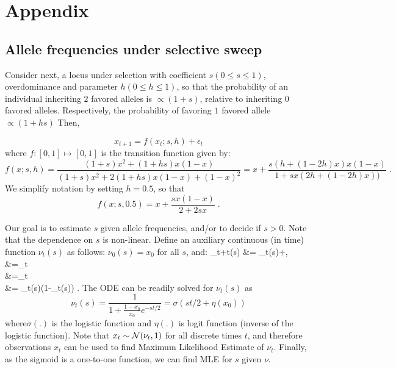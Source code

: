 \documentclass[11pt]{article}
\begin{document}
\newpage
\section{Appendix}
\subsection{Allele frequencies under selective sweep}
Consider next, a locus under selection with coefficient $s (0\le s\le
1)$, overdominance and parameter $h (0\le h\le 1)$, so that the
probability of an individual inheriting $2$ favored alleles is
$\propto (1+s)$, relative to inheriting $0$ favored
alleles. Respectively, the probability of favoring $1$ favored allele
$\propto (1+hs)$ Then,


\begin{equation}
x_{t+1} = f(x_t;s,h) + \epsilon_t
\label{eq:trans0} 
\end{equation}
where $f: [0,1] \mapsto [0,1]$ is the
transition function given by:
\begin{equation}
f(x;s,h)=\frac{(1+s)x^2 + (1+hs)x(1-x)}{(1+s)x^2 + 2(1+hs)x(1-x) + (1-x)^2}
=x+\frac{s(h+(1-2h)x)x(1-x)}{1+sx(2h+(1-2h)x))}\;.
\end{equation}
We simplify notation by setting $h=0.5$, so that
\begin{equation}
f(x;s,0.5)=x+\frac{sx(1-x)}{2+2sx}\;.
\label{eq:hequalshalf}
\end{equation}


Our goal is to estimate $s$ given allele frequencies, and/or to decide
if $s>0$. Note that the dependence on $s$ is non-linear. Define an
auxiliary continuous (in time) function $\nu_t(s)$ as follows:
$\nu_0(s)=x_0$ for all $s$, and:
\beqq
\nu_{t+\delta t}(s) &= \nu_t(s)+\;,\\
 &=\lim_{\delta t}\\
&=\lim_{\delta t}\\
&= \nu_t(s)(1-\nu_t(s)) \;.
\label{eq:ode}
\eeqq
The ODE can be readily solved for $\nu_t(s)$ as
\begin{equation}
\nu_t(s) =\frac{1}{1+\frac{1-x_0}{x_0}e^{-st/2}} = \sigma(st/2+\eta(x_0)) 
\label{eq:inf-pop}
\end{equation}
where$\sigma(.)$ is the logistic
function and $\eta(.)$ is logit function (inverse of the logistic function). Note 
that $x_t\sim{\cal N}(\nu_t,1)$ for all discrete times $t$,
and therefore observations $x_t$ can be used to find Maximum
Likelihood Estimate of $\nu_t$. Finally, as the sigmoid is a
one-to-one function, we can find MLE for $s$ given {\bf $\nu$}.
\end{document}
